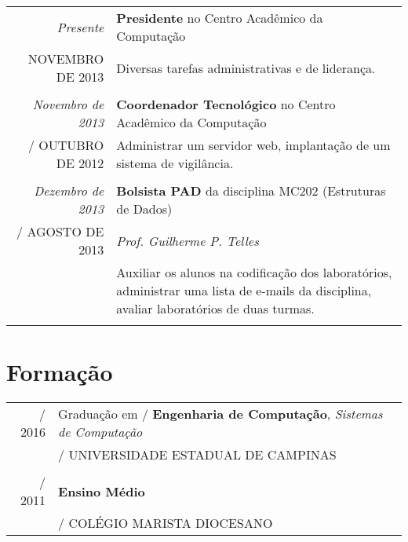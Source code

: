 \documentclass[a4paper,10pt]{article} %
\makeatletter
\def\fakesc#1{%
  \begingroup%
  \xdef\fake@name{\csname\curr@fontshape/\f@size\endcsname}%
  \fontsize{\fontdimen8\fake@name}{\baselineskip}\selectfont%
  \uppercase{#1}%
  \endgroup%
}
\renewcommand{\textsc}{\fakesc}
\makeatother
\begin{document}
\begin{tabular}{r|p{11cm}}
  \emph{Presente} & \textbf{Presidente} no Centro Acadêmico da Computação \\
 \textsc{Novembro de 2013} & \footnotesize{Diversas tarefas administrativas e de liderança.}\\
\multicolumn{2}{c}{} \\

  \emph{Novembro de 2013} & \textbf{Coordenador Tecnológico} no Centro Acadêmico da Computação \\
 \textsc{Outubro de 2012} & \footnotesize{Administrar um servidor web, implantação de um sistema de vigilância.}\\
\multicolumn{2}{c}{} \\

\emph{Dezembro de 2013} & \textbf{Bolsista PAD} da disciplina MC202 (Estruturas de Dados)\\
\textsc{Agosto de 2013} &  \emph{Prof. Guilherme P. Telles}\\
& \footnotesize {Auxiliar os alunos na codificação dos laboratórios, administrar uma lista de e-mails da disciplina, avaliar laboratórios de duas turmas.}\\
\multicolumn{2}{c}{}\\

\end{tabular}



\section{Formação}

\begin{tabular}{r|l}	

  \textsc{2016} & Graduação em \textsc{}\textbf{Engenharia de Computação}, \small\emph{Sistemas de Computação}\\
  & \normalsize\textsc{Universidade Estadual de Campinas}\\
\multicolumn{2}{c}{}\\

  \textsc{2011} & \textbf{Ensino Médio}\\ & \textsc{Colégio Marista Diocesano}
\end{tabular}
\end{document}
